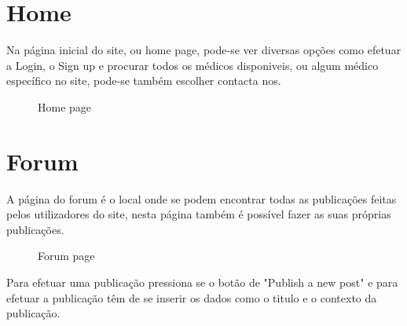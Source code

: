 \documentclass[12pt]{report}
\begin{document}
\section{Home}
\quad Na página inicial do site, ou home page, pode-se ver diversas opções como efetuar a Login, o Sign up e procurar todos os médicos disponiveis, ou algum médico específico no site, pode-se também escolher contacta nos.

\begin{figure}[H]{
{
\caption{Home page}
}
}\end{figure}

\newpage
\section{Forum}
 \quad A página do forum é o local onde se podem encontrar todas as publicações feitas pelos utilizadores do site, nesta página também é possível fazer as suas próprias publicações.
\begin{figure}[H]{
{
\caption{Forum page}
}
}\end{figure}

\quad Para efetuar uma publicação pressiona se o botão de "Publish a new post" e para efetuar a publicação têm de se inserir os dados como o titulo e o contexto da publicação.
 
\end{document}
